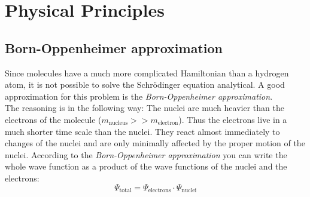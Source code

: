 \section{Physical Principles}
\subsection{Born-Oppenheimer approximation}
Since molecules have a much more complicated Hamiltonian than a hydrogen atom, it is not possible to solve the Schrödinger equation analytical. 
A good approximation for this problem is the \emph{Born-Oppenheimer approximation}.  \\
The reasoning is in the following way: The nuclei are much heavier than the electrons of the molecule ($m_{\text{nucleus}} >> m_{\text{electron}}$). 
Thus the electrons live in a much shorter time scale than the nuclei. They react almost immediately to 
changes of the nuclei and are only minimally affected by the proper motion of the nuclei. According to the \emph{Born-Oppenheimer approximation} 
you can write the whole wave function as a product of the wave functions of the nuclei and the electrons:
\begin{equation}
\label{eq:boapprox}
  \Psi_{\text{total}} = \Psi_{\text{electrons}} \cdot \Psi_{\text{nuclei}}
\end{equation}

